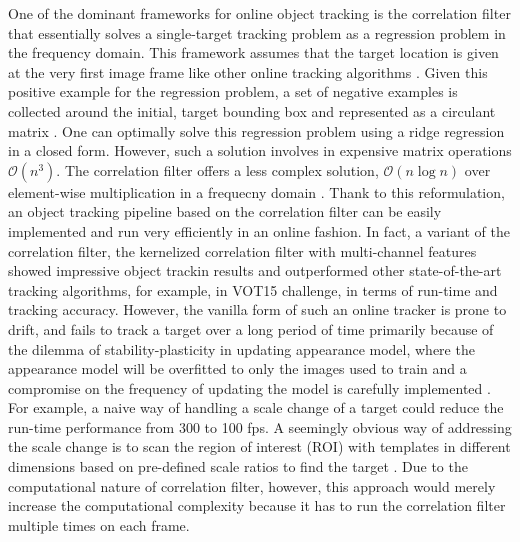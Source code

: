 \documentclass{bmvc2k}
\begin{document}
One of the dominant frameworks for online object tracking is the
correlation filter that essentially solves a single-target tracking
problem as a regression problem in the frequency domain. This
framework assumes that the target location is given at the very first
image frame like other online tracking algorithms
\cite{smeulders2014survey}. Given this positive example for the
regression problem, a set of negative examples is collected around the
initial, target bounding box and represented as a circulant matrix
\cite{henriques2015high}. One can optimally solve this regression
problem using a ridge regression in a closed form. However, such a
solution involves in expensive matrix operations
$\mathcal{O}(n^{3})$. The correlation filter offers a less complex
solution, $\mathcal{O}(n\log n)$ over element-wise multiplication in a
frequecny domain \cite{bolme2010visual,henriques2015high}. Thank to
this reformulation, an object tracking pipeline based on the
correlation filter can be easily implemented and run very efficiently
in an online fashion. In fact, a variant of the correlation filter,
the kernelized correlation filter with multi-channel features
\cite{henriques2015high} showed impressive object trackin results and
outperformed other state-of-the-art tracking algorithms, for example,
in VOT15 challenge, in terms of run-time and tracking
accuracy. However, the vanilla form of such an online tracker is prone
to drift, and fails to track a target over a long period of time
primarily \cite{henriques2015high} because of the dilemma of
stability-plasticity in updating appearance model, where the
appearance model will be overfitted to only the images used to train
and a compromise on the frequency of updating the model is carefully
implemented \cite{santner2010prost}. For example, a naive way of
handling a scale change of a target could reduce the run-time
performance from 300 to 100 fps. A seemingly obvious way of addressing
the scale change is to scan the region of interest (ROI) with
templates in different dimensions based on pre-defined scale ratios to
find the target
\cite{henriques2015high,tang2015multi,ma2015long,bibi2015multi,li2014scale}. Due
to the computational nature of correlation filter, however, this
approach would merely increase the computational complexity because it
has to run the correlation filter multiple times on each frame.
\end{document}

